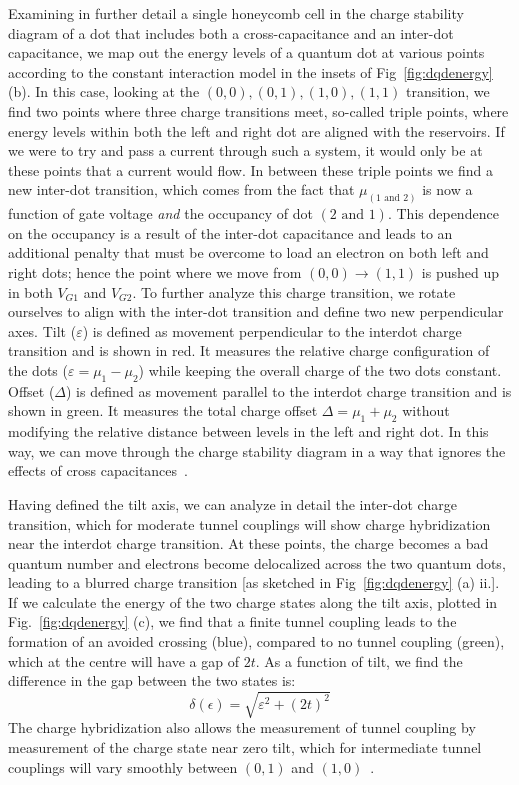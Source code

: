 Examining in further detail a single honeycomb cell in the charge stability diagram of a dot that includes both a cross-capacitance and an inter-dot capacitance, we map
out the energy levels of a quantum dot at various points according to the constant interaction model in the insets of Fig~\ref{fig:dqdenergy} (b).
In this case, looking at the $(0, 0), (0, 1), (1, 0), (1, 1)$ transition, we find two points where
three charge transitions meet, so-called triple points, where energy levels within both the left and right dot are aligned
with the reservoirs. If we were to try and pass a current through such a system, it would only be at these points that a
current would flow. In between these triple points we find a new inter-dot transition, which comes from the fact that $\mu_{(1 \textrm{~and~} 2)}$
is now a function of gate voltage \emph{and} the occupancy of dot $(2 \textrm{~and~} 1)$. This dependence on the
occupancy is a result of the inter-dot capacitance and leads to an additional penalty that must be
overcome to load an electron on both left and right dots; hence the point where we move from $(0, 0) \rightarrow (1, 1)$ is
pushed up in both $V_{G1}$ and $V_{G2}$. To further analyze this charge transition, we rotate ourselves to align with
the inter-dot transition and define two new perpendicular axes.
Tilt ($\varepsilon$) is defined as movement perpendicular to the interdot charge transition and is shown in red. It measures the relative
charge configuration of the dots ($\varepsilon = \mu_1 - \mu_2$) while keeping the overall charge of the two dots constant.
Offset ($\Delta$) is defined as movement parallel to the interdot charge transition and is shown in green.
It measures the total charge offset $\Delta = \mu_1 + \mu_2$ without modifying the relative distance between levels in the left
and right dot. In this way, we can move through the charge stability diagram in a way that ignores the effects of cross capacitances~\cite{qubyte}.

Having defined the tilt axis, we can analyze in detail the inter-dot charge transition, which for moderate tunnel couplings will show
charge hybridization near the interdot charge transition. At these points, the charge becomes a bad quantum number and electrons become delocalized
across the two quantum dots, leading to a blurred charge transition [as sketched in Fig~\ref{fig:dqdenergy} (a) ii.]. If we calculate the energy
of the two charge states along the tilt axis, plotted in Fig.~\ref{fig:dqdenergy} (c), we find that a finite tunnel coupling leads to the
formation of an avoided crossing (blue), compared to no tunnel coupling (green), which at the centre will have a gap of $2t$. As a function of
tilt, we find the difference in the gap between the two states is:
\begin{equation}
  \delta(\epsilon) = \sqrt{\varepsilon^2 + (2 t)^2}
\end{equation}
The charge hybridization also allows the measurement of tunnel coupling by measurement of the charge state near zero tilt,
which for intermediate tunnel couplings will vary smoothly between $(0, 1)$ and $(1, 0)$~\cite{PhysRevLett.92.226801}.

